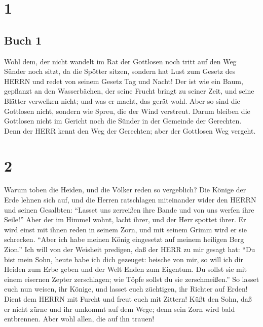 \hypertarget{section}{%
\section{1}\label{section}}

\hypertarget{buch-1}{%
\subsection{Buch 1}\label{buch-1}}

 Wohl dem, der nicht wandelt im Rat der Gottlosen noch tritt
auf den Weg Sünder noch sitzt, da die Spötter sitzen, 
sondern hat Lust zum Gesetz des HERRN und redet von seinem Gesetz Tag
und Nacht!  Der ist wie ein Baum, gepflanzt an den
Wasserbächen, der seine Frucht bringt zu seiner Zeit, und seine Blätter
verwelken nicht; und was er macht, das gerät wohl.  Aber so
sind die Gottlosen nicht, sondern wie Spreu, die der Wind verstreut.
 Darum bleiben die Gottlosen nicht im Gericht noch die
Sünder in der Gemeinde der Gerechten.  Denn der HERR kennt
den Weg der Gerechten; aber der Gottlosen Weg vergeht.

\hypertarget{section-1}{%
\section{2}\label{section-1}}

 Warum toben die Heiden, und die Völker reden so vergeblich?
 Die Könige der Erde lehnen sich auf, und die Herren
ratschlagen miteinander wider den HERRN und seinen Gesalbten:
 ``Lasset uns zerreißen ihre Bande und von uns werfen ihre
Seile!''  Aber der im Himmel wohnt, lacht ihrer, und der
Herr spottet ihrer.  Er wird einst mit ihnen reden in seinem
Zorn, und mit seinem Grimm wird er sie schrecken.  ``Aber
ich habe meinen König eingesetzt auf meinem heiligen Berg Zion.''
 Ich will von der Weisheit predigen, daß der HERR zu mir
gesagt hat: ``Du bist mein Sohn, heute habe ich dich gezeuget:
 heische von mir, so will ich dir Heiden zum Erbe geben und
der Welt Enden zum Eigentum.  Du sollst sie mit einem
eisernen Zepter zerschlagen; wie Töpfe sollst du sie zerschmeißen.''
 So lasset euch nun weisen, ihr Könige, und lasset euch
züchtigen, ihr Richter auf Erden!  Dient dem HERRN mit
Furcht und freut euch mit Zittern!  Küßt den Sohn, daß er
nicht zürne und ihr umkommt auf dem Wege; denn sein Zorn wird bald
entbrennen. Aber wohl allen, die auf ihn trauen!

